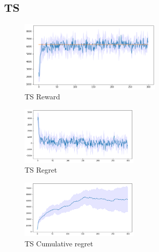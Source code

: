 \subsection{TS}
\begin{figure}[ht]
    \begin{center}
    \includegraphics[width=0.6\textwidth]{img/TS4.png}
    \caption{TS Reward}
    \label{fig:reward42}
    \end{center}
\end{figure}
\begin{multicols}{2}
    \begin{figure}[H]
        \begin{center}
        \includegraphics[width=0.5\textwidth]{img/TS4_regret.png}
        \caption{TS Regret}
        \label{fig:regret42}
        \end{center}
    \end{figure}
    \columnbreak
    \begin{figure}[H]
        \begin{center}
        \includegraphics[width=0.5\textwidth]{img/TS4_cum_reg.png}
        \caption{TS Cumulative regret}
        \label{fig:cum_reg42}
        \end{center}
    \end{figure}
\end{multicols}